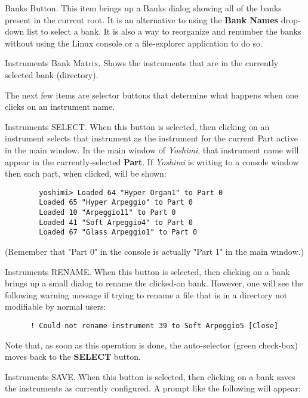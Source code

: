    Banks Button.
   This item brings up a Banks dialog showing all of the banks present in the
   current root.
   It is an alternative to using the \textbf{Bank Names} drop-down list to
   select a bank.  It is also a way to reorganize and renumber the
   banks without using the Linux console or a file-explorer application to do
   so.

   Instruments Bank Matrix.
   Shows the instruments that are in the currently selected bank
   (directory).

   The next few items are selector buttons that determine what happens when one
   clicks on an instrument name.

   Instruments SELECT.
   When this button is selected, then clicking on an instrument selects that
   instrument as the instrument for the current Part active in the main
   window.  In the main window of \textsl{Yoshimi}, that instrument name will
   appear in the currently-selected \textbf{Part}.  If \textsl{Yoshimi} is
   writing to a console window then each part, when clicked, will be shown:

   \begin{verbatim}
		yoshimi> Loaded 64 "Hyper Organ1" to Part 0
		Loaded 65 "Hyper Arpeggio" to Part 0
		Loaded 10 "Arpeggio11" to Part 0
		Loaded 41 "Soft Arpeggio4" to Part 0
		Loaded 67 "Glass Arpeggio1" to Part 0
   \end{verbatim}

   (Remember that "Part 0" in the console is actually "Part 1" in the main
   window.)

   Instruments RENAME.
   When this button is selected, then clicking on a bank brings
   up a small dialog to rename the clicked-on bank.
   However, one will see the following warning message if trying to rename a
   file that is in a directory not modifiable by normal users:

   \begin{verbatim}
      ! Could not rename instrument 39 to Soft Arpeggio5 [Close]
   \end{verbatim}

   Note that, as soon as this operation is done, the auto-selector (green
   check-box) moves back to the \textbf{SELECT} button.

   Instruments SAVE.
   When this button is selected, then clicking on a bank saves
   the instruments as currently configured.
   A prompt like the following will appear:

